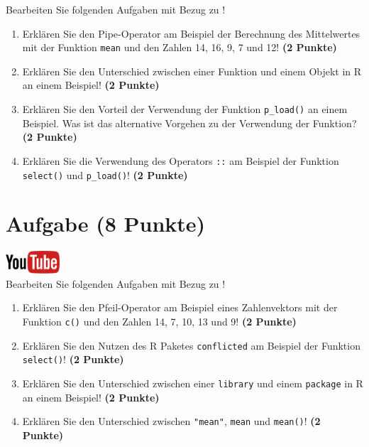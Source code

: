 \documentclass[a4paper, 10pt]{scrartcl}\usepackage[]{graphicx}\usepackage[]{xcolor}
\begin{document}
Bearbeiten Sie folgenden Aufgaben mit Bezug zu \Rlogo! 

\begin{enumerate}
\item Erkl{\"a}ren Sie den Pipe-Operator am Beispiel der Berechnung des Mittelwertes
mit der Funktion \texttt{mean} und den Zahlen 14, 16, 9, 7 und 12!  \textbf{(2 Punkte)} 
\item Erkl{\"a}ren Sie den Unterschied zwischen einer Funktion und einem Objekt
  in R an einem Beispiel! \textbf{(2 Punkte)} 
\item Erkl{\"a}ren Sie den Vorteil der Verwendung der Funktion \texttt{p\_load()} an
einem Beispiel. Was ist das alternative Vorgehen zu der Verwendung der
Funktion? \textbf{(2 Punkte)} 
\item Erkl{\"a}ren Sie die Verwendung des Operators \texttt{::} am Beispiel der
Funktion \texttt{select()} und \texttt{p\_load()}! \textbf{(2 Punkte)} 
\end{enumerate}


 
\clearpage

\section{Aufgabe \hfill (8 Punkte)}

\hfill\href{https://youtu.be/xP9xjcLIbDE}{\includegraphics[width =
  2cm]{img/youtube}}\\[1Ex]




Bearbeiten Sie folgenden Aufgaben mit Bezug zu \Rlogo! 

\begin{enumerate}
  \item Erkl{\"a}ren Sie den Pfeil-Operator am Beispiel eines Zahlenvektors mit der
Funktion \texttt{c()} und den Zahlen 14, 7, 10, 13 und 9! \textbf{(2 Punkte)}
\item Erkl{\"a}ren Sie den Nutzen des R Paketes \texttt{conflicted} am Beispiel der
  Funktion \texttt{select()}! \textbf{(2 Punkte)} 
\item Erkl{\"a}ren Sie den Unterschied zwischen einer \texttt{library} und
  einem \texttt{package} in R an einem Beispiel! \textbf{(2 Punkte)} 
\item Erkl{\"a}ren Sie den Unterschied zwischen \texttt{"mean"}, \texttt{mean}
  und \texttt{mean()}! \textbf{(2 Punkte)} 
\end{enumerate}
\end{document}
